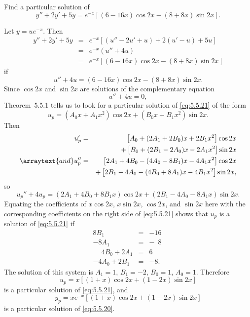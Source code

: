 \setcounter{example}{5}
\setcounter{equation}{19}
\begin{example}
  \label{example:5.5.6} \rm Find a particular solution of
  \begin{equation}
    \label{eq:5.5.20}y''+2y'+5y=e^{-x}\left[(6-16x)\cos2x-(8+8x)\sin2x\right].
  \end{equation}
\end{example}
\setcounter{equation}{20}
\begin{examplesolution}
\solution Let $y=ue^{-x}$. Then
\begin{eqnarray*}
  y''+2y'+5y & = & e^{-x}\left[(u''-2u'+u)+2(u'-u)+5u\right] \\
             & = & e^{-x}(u''+4u)                            \\
             & = & e^{-x}\left[(6-16x)\cos2x-(8+8x)\sin2x\right]
\end{eqnarray*}
if
\begin{equation}
  \label{eq:5.5.21}u''+4u=(6-16x)\cos2x-(8+8x)\sin2x.
\end{equation}
Since $\cos2x$ and $\sin2x$ are solutions of the complementary equation
\[
  u''+4u=0,
\]
Theorem~5.5.1 tells us to look for a particular solution of \eqref{eq:5.5.21} of the
form
\[
  u_{p}=(A_{0}x+A_{1}x^{2})\cos2x+(B_{0}x+B_{1}x^{2})\sin2x.
\]
Then
\begin{eqnarray*}
  u_{p}'                 & = & \left[A_{0}+(2A_{1}+2B_{0})x+2B_{1}x^{2}\right]\cos2x         \\
                         &   & +\left[B_{0}+(2B_{1}-2A_{0})x-2A_{1}x^{2}\right]\sin2x        \\
  \arraytext{and}u_{p}'' & = & \left[2A_{1}+4B_{0}-(4A_{0}-8B_{1})x-4A_{1}x^{2}\right]\cos2x \\
                         &   & +\left[2B_{1}-4A_{0}-(4B_{0}+8A_{1})x-4B_{1}x^{2}\right]\sin2x,
\end{eqnarray*}
so
\[
  u_{p}''+4u_{p}=(2A_{1}+4B_{0}+8B_{1}x)\cos2x+(2B_{1}-4A_{0}-8A_{1}x)\sin2x.
\]
Equating the coefficients of $x\cos2x$, $x\sin2x$, $\cos2x$, and $\sin2x$ here with the
corresponding coefficients on the right side of \eqref{eq:5.5.21} shows that $u_{p}$ is a solution
of \eqref{eq:5.5.21} if
\begin{equation}
  \label{eq:5.5.22}
  \begin{array}{rcr}
    8B_{1}                   & = & -16\phantom{.}           \\
    -8A_{1}                  & = & -\phantom{1}8\phantom{.} \\
    \phantom{-}4B_{0}+2A_{1} & = & 6\phantom{.}             \\
    -4A_{0}+2B_{1}           & = & -8.
  \end{array}
\end{equation}
The solution of this system is $A_{1}=1$, $B_{1}=-2$, $B_{0}=1$, $A_{0}=1$. Therefore
\[
  u_{p}=x[(1+x)\cos2x+(1-2x)\sin2x]
\]
is a particular solution of \eqref{eq:5.5.21}, and
\[
  y_{p}=xe^{-x}\left[(1+x)\cos2x+(1-2x)\sin2x\right]
\]
is a particular solution of \eqref{eq:5.5.20}. \bbox


\end{examplesolution}
